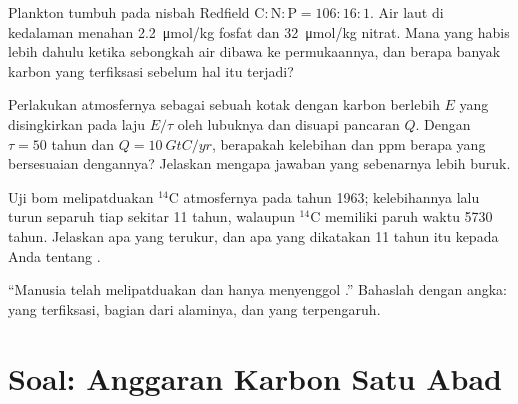 \begin{exercise}[$\star\star$]\label{exo:b2:biogeochemical-cycles:9}
Plankton tumbuh pada nisbah Redfield $\mathrm{C:N:P} = 106:16:1$. Air
laut di kedalaman menahan \qty{2.2}{\micro mol/kg} fosfat dan
\qty{32}{\micro mol/kg} nitrat. Mana yang habis lebih dahulu ketika
sebongkah air dibawa ke permukaannya, dan berapa banyak karbon yang
terfiksasi sebelum hal itu terjadi?
\end{exercise}

\begin{exercise}[$\star\star\star$]\label{exo:b2:biogeochemical-cycles:10}
Perlakukan atmosfernya sebagai sebuah kotak dengan karbon berlebih $E$
yang disingkirkan pada laju $E/\tau$ oleh lubuknya dan disuapi pancaran
$Q$. Dengan $\tau =
50$ tahun dan $Q = \qty{10}{GtC/yr}$, berapakah
kelebihan  dan ppm berapa yang bersesuaian dengannya?
Jelaskan mengapa jawaban yang sebenarnya lebih buruk.
\end{exercise}

\begin{exercise}[$\star\star\star$]\label{exo:b2:biogeochemical-cycles:11}
Uji bom melipatduakan $\mathrm{{}^{14}C}$ atmosfernya pada tahun 1963;
kelebihannya lalu turun separuh tiap sekitar 11 tahun, walaupun
$\mathrm{{}^{14}C}$ memiliki paruh waktu 5730 tahun. Jelaskan apa yang
terukur, dan apa yang dikatakan 11 tahun itu kepada Anda tentang .
\end{exercise}

\begin{exercise}[$\star\star\star$]\label{exo:b2:biogeochemical-cycles:12}
``Manusia telah melipatduakan  dan hanya menyenggol
.'' Bahaslah dengan angka:  yang terfiksasi, bagian
dari  alaminya, dan  yang terpengaruh.
\end{exercise}

\section{Soal: Anggaran Karbon Satu Abad}

